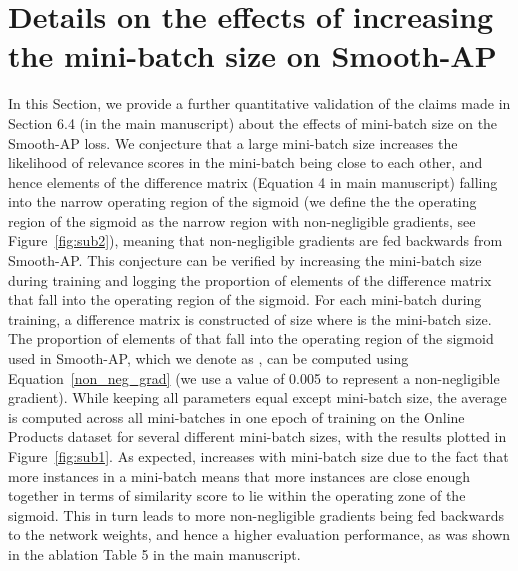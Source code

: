 \documentclass[runningheads]{llncs}
\newcommand\aftercaptions{\vspace{-5mm}}
\begin{document}
\begin{comment}

\clearpage


\begin{table}[h]
\centering
\small{\textbf{Algorithm:} Pseudocode for Smooth-AP in Pytorch-style}
\vspace{5pt}
\hrule
\hspace{5pt}

\inputminted[fontsize=\footnotesize]{python}{code/apLoss.py}
\hrule
\caption{\small{pseudocode for the proposed Smooth-AP loss in PyTorch style. 
The method is very simple to implement and takes only a few lines of code.}}
\aftercaptions
\vspace{-0.3cm}
\label{fig:algo}
\end{table}
\end{comment} 



\section{Details on the effects of increasing the mini-batch size on Smooth-AP}
In this Section, we provide a further quantitative validation of the claims made in Section 6.4 (in the main manuscript) about the effects of mini-batch size on the Smooth-AP loss. We conjecture that a large mini-batch size increases the likelihood of relevance scores in the mini-batch being close to each other, and hence elements of the difference matrix (Equation 4 in main manuscript) falling into the narrow operating region of the sigmoid (we define the the operating region of the sigmoid as the narrow region with non-negligible gradients, see Figure~\ref{fig:sub2}), meaning that non-negligible gradients are fed backwards from Smooth-AP. This conjecture can be verified by increasing the mini-batch size during training and logging the proportion of elements of the difference matrix that fall into the operating region of the sigmoid. For each mini-batch during training, a difference matrix  is constructed of size  where  is the mini-batch size. The proportion of elements of  that fall into the operating region of the sigmoid used in Smooth-AP, which we denote as ,  can be computed using Equation~\ref{non_neg_grad} (we use a value of 0.005 to represent a non-negligible gradient). While keeping all parameters equal except mini-batch size, the average  is computed across all mini-batches in one epoch of training on the Online Products dataset for several different mini-batch sizes, with the results plotted in Figure~\ref{fig:sub1}. As expected,  increases with mini-batch size due to the fact that more instances in a mini-batch means that more instances are close enough together in terms of similarity score to lie within the operating zone of the sigmoid. This in turn leads to more non-negligible gradients being fed backwards to the network weights, and hence a higher evaluation performance, as was shown in the ablation Table 5 in the main manuscript.
\end{document}
